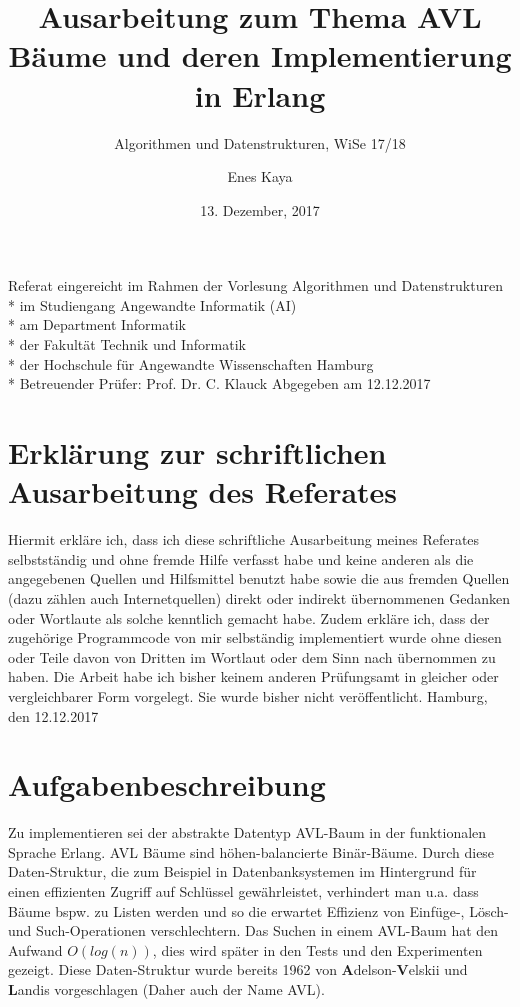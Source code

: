 \documentclass{article}
\title{Ausarbeitung zum Thema AVL Bäume und deren Implementierung in Erlang}
\subtitle{Algorithmen und Datenstrukturen, WiSe 17/18}
\date{13. Dezember, 2017}
\author{Enes Kaya}
\begin{document}
  \maketitle
  \newpage

  Referat eingereicht im Rahmen der Vorlesung Algorithmen und Datenstrukturen\\*
  im Studiengang Angewandte Informatik (AI)\\*
  am Department Informatik\\*
  der Fakultät Technik und Informatik\\*
  der Hochschule für Angewandte Wissenschaften Hamburg\\*
  \newline
  Betreuender Prüfer: Prof. Dr. C. Klauck
  \newline
  Abgegeben am 12.12.2017
  
  \newpage
  \tableofcontents
  
  \newpage
  \section{Erklärung zur schriftlichen Ausarbeitung des Referates}
  
  Hiermit erkläre ich, dass ich diese schriftliche Ausarbeitung meines Referates selbstständig und ohne fremde Hilfe verfasst habe und keine anderen als die angegebenen Quellen und Hilfsmittel benutzt habe sowie die aus fremden Quellen (dazu zählen auch Internetquellen) direkt oder indirekt übernommenen Gedanken oder Wortlaute als solche kenntlich gemacht habe. Zudem erkläre ich, dass der zugehörige Programmcode von mir selbständig implementiert wurde ohne diesen oder Teile davon von Dritten im Wortlaut oder dem Sinn nach übernommen zu haben. Die Arbeit habe ich bisher keinem anderen Prüfungsamt in gleicher oder vergleichbarer Form vorgelegt. Sie wurde bisher nicht veröffentlicht.
  \newline
  \newline
  \newline
  Hamburg, den 12.12.2017
  
  \newpage
  \section{Aufgabenbeschreibung}
	Zu implementieren sei der abstrakte Datentyp AVL-Baum in der funktionalen Sprache Erlang. AVL Bäume sind höhen-balancierte Binär-Bäume. Durch diese Daten-Struktur, die zum Beispiel in Datenbanksystemen im Hintergrund für einen effizienten Zugriff auf Schlüssel gewährleistet, verhindert man u.a. dass Bäume bspw. zu Listen werden und so die erwartet Effizienz von Einfüge-, Lösch- und Such-Operationen verschlechtern. Das Suchen in einem AVL-Baum hat den Aufwand $O(log(n))$, dies wird später in den Tests und den Experimenten gezeigt.
	Diese Daten-Struktur wurde bereits 1962 von \textbf{A}delson-\textbf{V}elskii und \textbf{L}andis vorgeschlagen (Daher auch der Name AVL).
	
\end{document}
